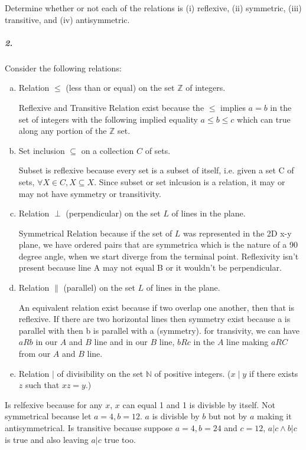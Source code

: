 \documentclass[11pt, a4paper]{article}
\begin{document}
		Determine whether or not each of the relations is (i) reflexive, (ii) symmetric, (iii) transitive, and (iv) antisymmetric.

		\subparagraph{2.} Consider the following relations:
        \begin{enumerate}[(a)]
			\item Relation $\leq$ (less than or equal) on the set $\mathbb{Z}$ of integers.

                Reflexive and Transitive Relation exist because the $\leq$ implies $a=b$ in the set of integers  with the following implied equality $a\leq b \leq c$ which can true along any portion of the $\mathbb{Z}$ set. 

			\item Set inclusion $\subseteq$ on a collection $C$ of sets.

                Subset is reflexive because every set is a subset of itself, i.e. given a set C of sets, $\forall X\in C, X\subseteq X$.  Since subset or set inlcusion is a relation, it may or may not have symmetry or transitivity.

			\item Relation $\perp$ (perpendicular) on the set $L$ of lines in the plane.

                Symmetrical Relation because if the set of $L$ was represented in the 2D x-y plane, we have ordered  pairs that are symmetrica which is the nature of a 90 degree angle, when we start diverge from the terminal point. Reflexivity isn't present because line A may not equal B or it wouldn't be perpendicular.

			\item Relation $\parallel$ (parallel) on the set $L$ of lines in the plane.

                An equivalent relation exist because if two overlap one another, then that is reflexive. If there are two horizontal lines then symmetry exist because a is parallel with then b is parallel with a (symmetry). for transivity, we can have $aRb$ in our $A$ and $B$ line and in our $B$ line, $bRc$ in the $A$ line making $aRC$ from our $A$ and $B$ line. 

			\item Relation $\mid$ of divisibility on the set $\mathbb{N}$ of positive integers. ($x \mid y$ if there exists $z$ such that $xz = y$.)
        \end{enumerate}

            Is relfexive because for any $x$, $x$ can equal 1 and 1 is divisble by itself. Not symmetrical because let $a = 4, b = 12$. $a$ is divisble by $b$ but not by $a$ making it antisymmetrical. Is transitive because suppose $a = 4, b = 24$ and $c = 12$, $a | c \land b | c$ is true and also leaving $a | c$ true too.
\end{document}
